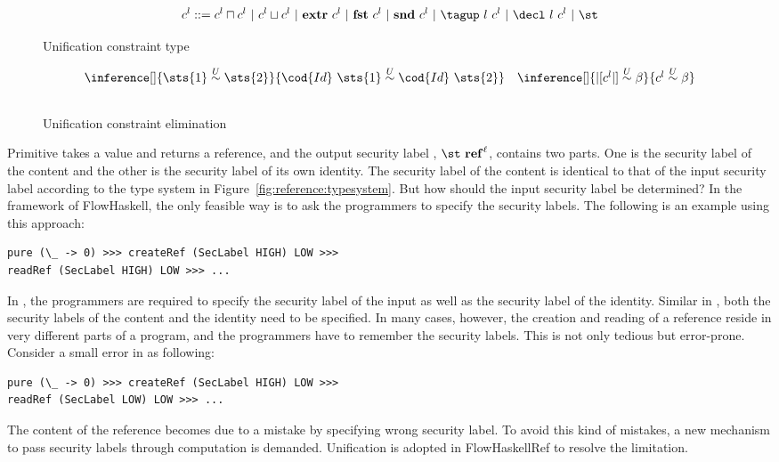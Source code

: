 \begin{figure}[t]
\[
\ct ::= \ct\sqcap \ct\ |\ \ct\sqcup \ct\ |\ \mathbf{extr}\ \ct\ |\ \mathbf{fst}\ \ct\ |\ \mathbf{snd}\ \ct\        
        |\ \tagup\ l\ \ct\ |\ \decl\ l\ \ct\ |\ \st
\]
\caption{Unification constraint type}
\label{fig:unif:ct}
\end{figure}

\begin{figure}[t]
\[
 \begin{array}{c}
 \inference[]{\sts{1}\unify{U} \sts{2}}
             {\cod{Id}\ \sts{1}\unify{U} \cod{Id}\ \sts{2}} \quad
 \inference[]{|[\ct|]\unify{U} \beta}
             {\ct\unify{U} \beta} \\ \\
 \end{array}
\]
\caption{Unification constraint elimination}
\label{fig:unif:ce}
\end{figure}

Primitive  takes a value and returns a reference, and the output security label 
, $\st~\mathbf{ref}^{\ell}$, contains two parts. 
One is the security label of the content and the other is the security label
of its own identity. The security label of the content is identical to that of the input
security label according to the type system in Figure~\ref{fig:reference:typesystem}. But how 
should the input security label be determined? In the framework
of FlowHaskell, the only feasible way is to ask the programmers to specify the security labels.
The following is an example using this approach:
\begin{verbatim}
pure (\_ -> 0) >>> createRef (SecLabel HIGH) LOW >>> 
readRef (SecLabel HIGH) LOW >>> ...
\end{verbatim}
In , the programmers are required to specify the security label of the input as well as
the security label of the identity. Similar in \co{readRef}, both the security labels of the content and
the identity need to be specified. In many cases, however, the creation and reading of a reference reside in
very different parts of a program, and the programmers have to remember the security labels. This is
not only tedious but error-prone. Consider a small error in \co{readRef} as following:
\begin{verbatim}
pure (\_ -> 0) >>> createRef (SecLabel HIGH) LOW >>>
readRef (SecLabel LOW) LOW >>> ...
\end{verbatim}
The  content of the reference becomes  due to a mistake by specifying wrong security label. To avoid this kind of mistakes, a new mechanism to pass security labels through computation 
is demanded. Unification is adopted in FlowHaskellRef to resolve the limitation.

